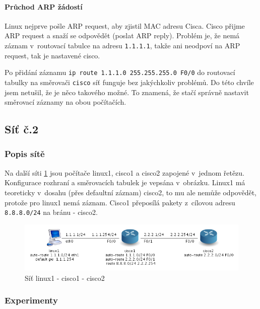 \paragraph{Průchod ARP žádostí}
Linux nejprve pošle ARP request, aby zjistil MAC adresu Cisca. Cisco přijme ARP request a snaží se odpovědět (poslat ARP reply). Problém je, že nemá záznam v~routovací tabulce na adresu \verb|1.1.1.1|, takže ani neodpoví na ARP request, tak  je nastavené cisco.

Po přidání záznamu \verb|ip route 1.1.1.0 255.255.255.0 F0/0| do routovací tabulky na směrovači \verb|cisco| síť funguje bez jakýchkoliv problémů. Do této chvíle jsem netušil, že je něco takového možné. To znamená, že stačí správně nastavit směrovací záznamy na obou počítačích.


\subsection{Síť č.2}
\subsubsection{Popis sítě}
Na další síti \ref{fig:sit_3pc} jsou počítače linux1, cisco1 a cisco2 zapojené v~jednom řetězu. Konfigurace rozhraní a směrovacích tabulek je vepsána v~obrázku. Linux1 má teoreticky v~dosahu (přes defaultní záznam) cisco2, to mu ale nemůže odpovědět, protože pro linux1 nemá záznam. Cisco1 přeposílá pakety z~cílovou adresu \verb|8.8.8.0/24| na bránu - cisco2.

\begin{figure}[h]
\begin{center}
\includegraphics[width=15cm]{figures/sit_3pc.png}
\caption{Síť linux1 - cisco1 - cisco2}
\label{fig:sit_3pc}
\end{center}
\end{figure}


\newpage

\subsubsection{Experimenty} 

